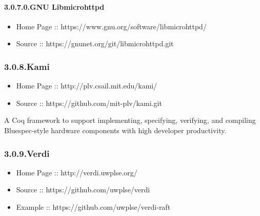 \documentclass[12pt,twoside]{article}
\begin{document}
\paragraph{3.0.7.0.\hspace*{0.5em}GNU Libmicrohttpd}\label{sec-gnu-libmicrohttpd}%

\begin{itemize}[noitemsep,topsep=\mdcompacttopsep]%

\item{}Home Page :: https://www.gnu.org/software/libmicrohttpd/%

\item{}Source :: https://gnunet.org/git/libmicrohttpd.git%
\end{itemize}%

\subsubsection{3.0.8.\hspace*{0.5em}Kami}\label{sec-kami}%

\begin{itemize}[noitemsep,topsep=\mdcompacttopsep]%

\item{}Home Page :: http://plv.csail.mit.edu/kami/%

\item{}Source :: https://github.com/mit-plv/kami.git%
\end{itemize}%

\noindent{}A Coq framework to support implementing, specifying, verifying, and
compiling Bluespec-style hardware components with high developer
productivity.%

\subsubsection{3.0.9.\hspace*{0.5em}Verdi}\label{sec-verdi}%

\begin{itemize}[noitemsep,topsep=\mdcompacttopsep]%

\item{}Home Page :: http://verdi.uwplse.org/%

\item{}Source :: https://github.com/uwplse/verdi%

\item{}Example :: https://github.com/uwplse/verdi-raft%
\end{itemize}%
\end{document}
